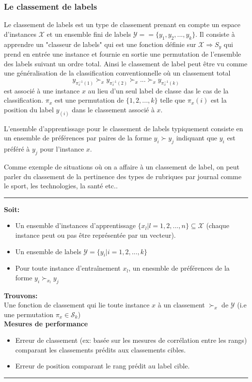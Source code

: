 \documentclass[a4paper,12pt,openany,oneside]{article}
\begin{document}
\subsubsection{Le classement de labels}
Le classement de labels est un type de classement prenant en compte un espace d'instances $\mathcal{X}$ et un ensemble fini de labels $\mathcal{Y}==\{y_1, y_2,...,y_k\}$. Il consiste à apprendre un "classeur de labels" qui est une fonction définie sur $\mathcal{X}\Rightarrow S_y$ qui prend en entrée une instance et fournie en sortie une permutation de l'ensemble des labels suivant un ordre total.
Ainsi le classement de label peut être vu comme une généralisation de la classification conventionnelle où un classement total 
\[
	y_{\pi_x^{-1} (1)}\succ_x y_{\pi_x^{-1} (2)}\succ_x ...\succ_x y_{\pi_x^{-1} (k)}
\]
est associé à une instance $x$ au lieu d'un seul label de classe das le cas de la classification. $\pi_x$ est une permutation de $\{1,2,...,k\}$ telle que $\pi_x(i)$ est la position du label $y_(i)$ dans le classement associé à $x$.

L'ensemble d'apprentissage pour le classement de labels typiquement consiste en un ensemble de préférences par paires de la forme $y_i\succ y_j$ indiquant que $y_i$ est préféré à $y_j$ pour l'instance $x$.  

Comme exemple de situations où on a affaire à un classement de label, on peut parler du classement de la pertinence des types de rubriques par journal comme le sport, les technologies, la santé etc..


\noindent \rule{\textwidth}{1pt}

\textbf{Soit:}
\begin{itemize}
	\item Un ensemble d'instances d'apprentissage $\{x_l| l=1,2,...,n\}\subseteq \mathcal{X}$ (chaque instance peut ou pas être représentée par un vecteur).
	\item Un ensemble de labels $\mathcal{Y}=\{y_i|i=1,2,...,k\}$
	\item Pour toute instance d'entraînement $x_l$, un enesmble de préférences de la forme $y_i\succ_{x_l} y_j$
\end{itemize}
 \textbf{Trouvons:}\\
 Une fonction de classement qui lie toute instance $x$ à un classement $\succ_x$ de $\mathcal{Y}$ (i.e une permutation $\pi_x\in \mathcal{S}_k$)\\
 
 \textbf{Mesures de performance}
 \begin{itemize}
 	\item Erreur de classement (ex: basée sur les mesures de corrélation entre les rangs) comparant les classements prédits aux classements cibles.
 	\item Erreur de position comparant le rang prédit au label cible.
 \end{itemize}
  \noindent \rule{\textwidth}{1pt}
  
\end{document}
